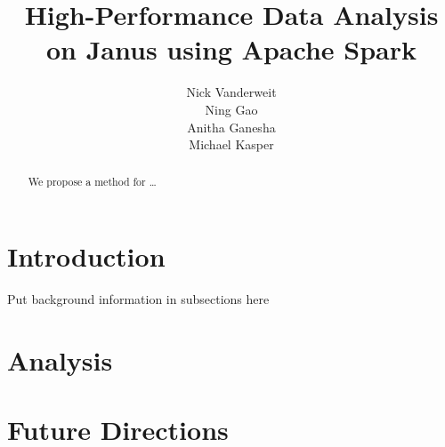 \documentclass{article}
\title{High-Performance Data Analysis on Janus using Apache Spark}
\author{Nick Vanderweit \\
        Ning Gao \\
        Anitha Ganesha \\
        Michael Kasper}
\begin{document}
\maketitle

\begin{abstract}
We propose a method for \ldots
\end{abstract}

\section*{Introduction}
Put background information in subsections here

\section*{Analysis}
\section*{Future Directions}
\end{document}
